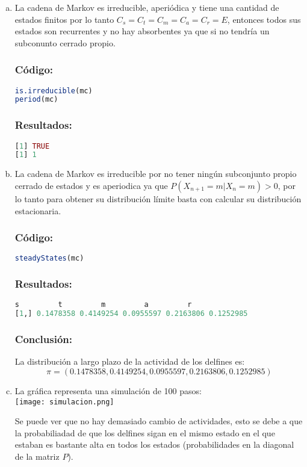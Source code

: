 \documentclass{article}
\begin{document}
\begin{enumerate}[(a)] %
\item La cadena de Markov es irreducible, aperiódica y tiene una cantidad de estados finitos por lo tanto $C_s = C_t = C_m = C_a = C_r = E$, entonces todos sus estados son recurrentes y no hay absorbentes ya que si no tendría un subconunto cerrado propio.

\subsubsection*{Código:}
\begin{lstlisting}[language=R]
is.irreducible(mc)
period(mc)
\end{lstlisting}

\subsubsection*{Resultados:}
\begin{lstlisting}[language=R]
[1] TRUE
[1] 1
\end{lstlisting}

\item La cadena de Markov es irreducible por no tener ningún subconjunto propio cerrado de estados y es aperiodica ya que $P(X_{n+1} = m | X_n = m) > 0$, por lo tanto para obtener su distribución límite basta con calcular su distribución estacionaria.

\subsubsection*{Código:}
\begin{lstlisting}[language=R]
steadyStates(mc)
\end{lstlisting}

\subsubsection*{Resultados:}
\begin{lstlisting}[language=R]
             s         t         m         a         r
[1,] 0.1478358 0.4149254 0.0955597 0.2163806 0.1252985
\end{lstlisting}
\subsubsection*{Conclusión:}
La distribución a largo plazo de la actividad de los delfines es:
$$ \pi = (0.1478358,0.4149254,0.0955597,0.2163806,0.1252985) $$
\item  La gráfica representa una simulación de 100 pasos: \\
\texttt{[image: simulacion.png]}

Se puede ver que no hay demasiado cambio de actividades, esto se debe a que la probabiliadad de que los delfines sigan en el mismo estado en el que estaban es bastante alta en todos los estados (probabilidades en la diagonal de la matriz $P$). 
\end{enumerate}
\pagebreak
\end{document}
